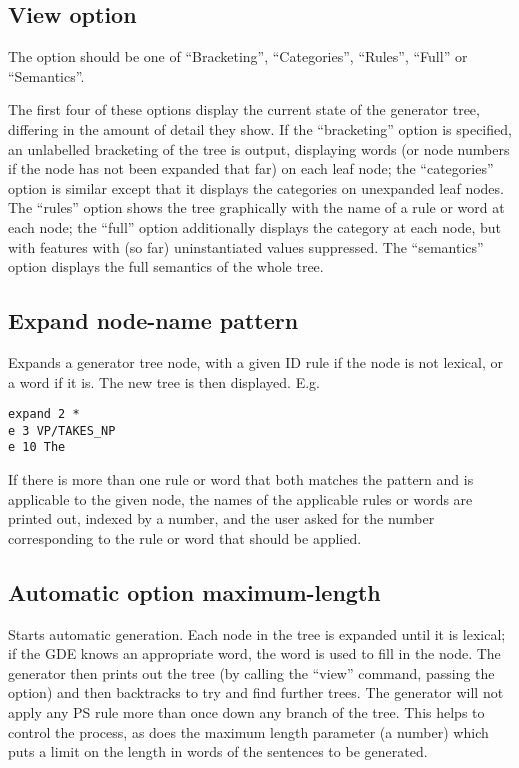 \subsection{View option}

The option should be one of ``Bracketing'', ``Categories'', ``Rules'',
``Full'' or ``Semantics''.

The first four of these options display the current state of the generator tree,
differing in the amount of detail they show. If the ``bracketing'' option
is specified, an unlabelled bracketing of the tree is output, displaying words
(or node numbers if the node has not been expanded that far) on each leaf node;
the ``categories'' option is similar except that it displays the categories
on unexpanded leaf nodes. The
``rules'' option shows the tree graphically with the name of a rule or word at
each node; the ``full'' option additionally displays the category at
each node, but with features with (so far) uninstantiated values suppressed.
The ``semantics'' option displays the full semantics of the whole tree.

\subsection{Expand node-name pattern}

Expands a generator tree node, with a given ID rule if the node is not
lexical, or a word if it is. The new tree is then displayed. E.g.
\begin{ex}
\begin{verbatim}
expand 2 *
e 3 VP/TAKES_NP
e 10 The
\end{verbatim}
\end{ex}
If there is more than one rule or word that both matches the pattern and is
applicable to the given node, the names of the applicable rules or words are
printed out, indexed by a number, and the user asked for the number
corresponding to the rule or word that should be applied.

\subsection{Automatic option maximum-length}

Starts automatic generation. Each node in the tree is
expanded until it is lexical; if the GDE knows an appropriate word, the
word is used to fill in the node. The generator then prints out the tree
(by calling the ``view'' command, passing the option) and then backtracks to
try and find further trees. The generator will not apply any PS
rule more than once down any branch of the tree.  This helps to control
the process, as does the maximum length parameter (a number)
which puts a limit on the length in words of the sentences
to be generated.
   
